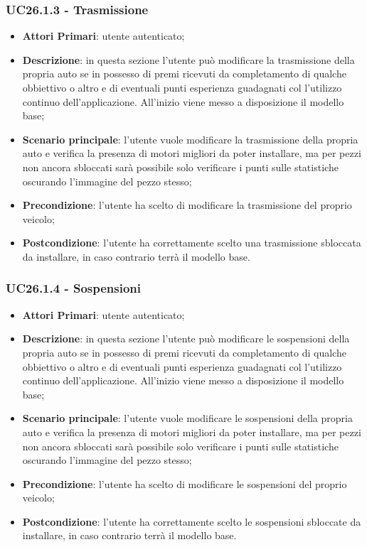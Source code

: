 \subsubsection{UC26.1.3 - Trasmissione}
\begin{itemize}
	\item \textbf{Attori Primari}: utente autenticato;
	\item \textbf{Descrizione}: in questa sezione l'utente può modificare la trasmissione della propria auto se in possesso di premi ricevuti da completamento di qualche obbiettivo o altro e di eventuali punti esperienza guadagnati col l'utilizzo continuo dell'applicazione.
	All'inizio viene messo a disposizione il modello base;
	\item \textbf{Scenario principale}: l'utente vuole modificare la trasmissione della propria auto e verifica la presenza di motori migliori da poter installare, ma per pezzi non ancora sbloccati sarà possibile solo verificare i punti sulle statistiche oscurando l'immagine del pezzo stesso;
	\item \textbf{Precondizione}: l'utente ha scelto di modificare la trasmissione del proprio veicolo; 
	\item \textbf{Postcondizione}: l'utente ha correttamente scelto una trasmissione sbloccata da installare, in caso contrario terrà il modello base.
\end{itemize}
\subsubsection{UC26.1.4 - Sospensioni}
\begin{itemize}
	\item \textbf{Attori Primari}: utente autenticato;
	\item \textbf{Descrizione}: in questa sezione l'utente può modificare le sospensioni della propria auto se in possesso di premi ricevuti da completamento di qualche obbiettivo o altro e di eventuali punti esperienza guadagnati col l'utilizzo continuo dell'applicazione.
	All'inizio viene messo a disposizione il modello base;
	\item \textbf{Scenario principale}: l'utente vuole modificare le sospensioni della propria auto e verifica la presenza di motori migliori da poter installare, ma per pezzi non ancora sbloccati sarà possibile solo verificare i punti sulle statistiche oscurando l'immagine del pezzo stesso;
	\item \textbf{Precondizione}: l'utente ha scelto di modificare le sospensioni del proprio veicolo; 
	\item \textbf{Postcondizione}: l'utente ha correttamente scelto le sospensioni sbloccate da installare, in caso contrario terrà il modello base.
\end{itemize}
